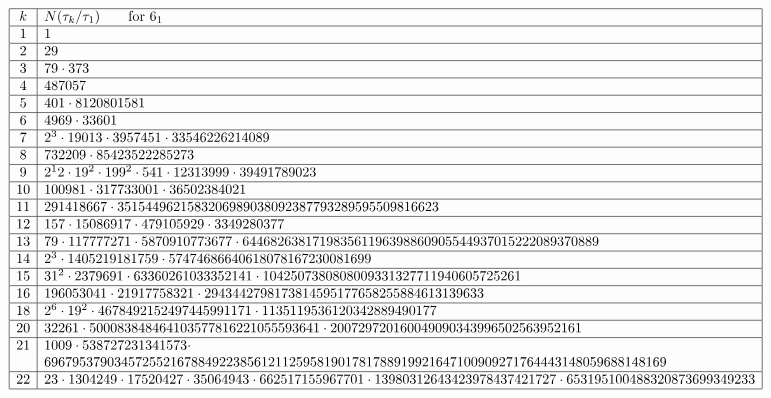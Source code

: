 \documentclass[12pt]{amsart}
\theoremstyle{definition}
\def\be{  \begin{equation} }
\def\ee{  \end{equation} }
\begin{document}
{\tiny
\be
\label{t.61norm}
\begin{array}{|c|l|} \hline
k & N(\tau_k/\tau_1) \qquad \text{for $6_1$} \\ \hline
1 & 1 \\ \hline
2 & 29 \\ \hline
3 & 79 \cdot 373 \\ \hline
4 & 487057 \\ \hline
5 & 401 \cdot 8120801581 \\ \hline
6 & 4969 \cdot 33601 \\ \hline
7 & 2^3 \cdot 19013 \cdot 3957451 \cdot 33546226214089 \\ \hline
8 & 732209 \cdot 85423522285273 \\ \hline
9 & 2^12 \cdot 19^2 \cdot 199^2 \cdot 541 \cdot 12313999 \cdot 39491789023 
\\ \hline
10 & 100981 \cdot 317733001 \cdot 36502384021 \\ \hline
11 & 291418667 \cdot 3515449621583206989038092387793289595509816623 \\ \hline
12 & 157 \cdot 15086917 \cdot 479105929 \cdot 3349280377 \\ \hline
13 & 79 \cdot 117777271 \cdot 5870910773677 \cdot 
     644682638171983561196398860905544937015222089370889 \\ \hline
14 & 2^3 \cdot 1405219181759 \cdot 57474686640618078167230081699 \\ \hline
15 & 31^2 \cdot 2379691 \cdot 63360261033352141 \cdot 
     1042507380808009331327711940605725261 \\ \hline
16 & 196053041 \cdot 21917758321 \cdot 
2943442798173814595177658255884613139633 \\ \hline
18 & 2^6 \cdot 19^2 \cdot 4678492152497445991171 \cdot 
1135119536120342889490177 \\ \hline
20 & 32261 \cdot 500083848464103577816221055593641 \cdot 
     200729720160049090343996502563952161 \\ \hline
21 & 1009 \cdot 538727231341573 \cdot 
\\ &
69679537903457255216788492238561211259581901781788919921647100909271764443148059688148169 \\ \hline
22 & 23 \cdot 1304249 \cdot 17520427 \cdot 35064943 \cdot 662517155967701 \cdot 
     13980312643423978437421727 \cdot 653195100488320873699349233
\\ \hline
\end{array}
\ee
}
\end{document}
